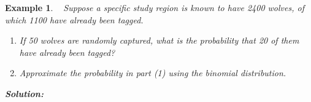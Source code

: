 \documentclass[12pt]{amsart}
\newtheorem{example}[theorem]{Example}
\begin{document}
{%
\begin{example}\ %
Suppose a specific study region is known to have 2400 wolves,  of which 1100 have already been tagged. 

\begin{enumerate}
\item If 50 wolves are randomly captured, what is the probability that 20 of them have already been tagged?
\item Approximate the probability in part (1) using the binomial distribution.
\end{enumerate}
\textbf{Solution:}

\end{example}


\newpage

}  %
\end{document}

